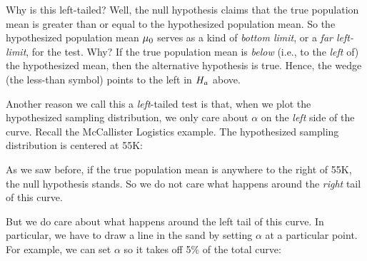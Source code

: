 \documentclass[../../../main.tex]{subfiles}
\begin{document}
Why is this left-tailed? Well, the null hypothesis claims that the true population mean is greater than or equal to the hypothesized population mean. So the hypothesized population mean $\HypPopMean/$ serves as a kind of \emph{bottom limit}, or a \emph{far left-limit}, for the test. Why? If the true population mean is \emph{below} (i.e., to the \emph{left} of) the hypothesized mean, then the alternative hypothesis is true. Hence, the wedge (the less-than symbol) points to the left in $\AltHyp/$ above.

Another reason we call this a \emph{left}-tailed test is that, when we plot the hypothesized sampling distribution, we only care about $\alpha$ on the \emph{left} side of the curve. Recall the McCallister Logistics example. The hypothesized sampling distribution is centered at 55K:

\begin{center}
\end{center}

\noindent
As we saw before, if the true population mean is anywhere to the right of 55K, the null hypothesis stands. So we do not care what happens around the \emph{right} tail of this curve.

But we do care about what happens around the left tail of this curve. In particular, we have to draw a line in the sand by setting $\alpha$ at a particular point. For example, we can set $\alpha$ so it takes off 5\% of the total curve:
\end{document}
